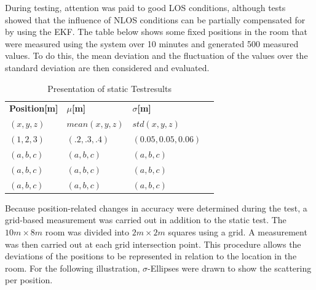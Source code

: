 \documentclass[10pt,a4paper,twocolumn]{article}
\begin{document}
During testing, attention was paid to good \ac{LOS} conditions,
although tests showed that the influence of \ac{NLOS} conditions can be partially compensated for by using the \ac{EKF}.
The table below shows some fixed positions in the room that were measured using the system over 10 minutes and generated 500 measured values.
To do this, the mean deviation and the fluctuation of the values over the standard deviation are then considered and evaluated.

\begin{table}[H]
  \centering
  \begin{tabular}{l l l c}
    \toprule
    \textbf{Position[m]} & \textbf{$\mu$[m]} & \textbf{$\sigma$[m]}\\
    $(x,y,z)$ & $mean(x,y,z)$ & $std(x, y, z)$\\
    \midrule
    $(1,2,3)$ & $(.2,.3,.4)$ & $(0.05,0.05,0.06)$\\
    $(a,b,c)$ & $(a,b,c)$ & $(a,b,c)$\\
    $(a,b,c)$ & $(a,b,c)$ & $(a,b,c)$\\
    $(a,b,c)$ & $(a,b,c)$ & $(a,b,c)$\\
    \bottomrule
  \end{tabular}
  \caption{Presentation of static Testresults}
\end{table}

Because position-related changes in accuracy were determined during the test,
a grid-based measurement was carried out in addition to the static test.
The $10m\times8m$ room was divided into $2m\times2m$ squares using a grid.
A measurement was then carried out at each grid intersection point.
This procedure allows the deviations of the positions to be represented in relation to the location in the room.
For the following illustration, $\sigma$-Ellipses were drawn to show the scattering per position.
\end{document}
